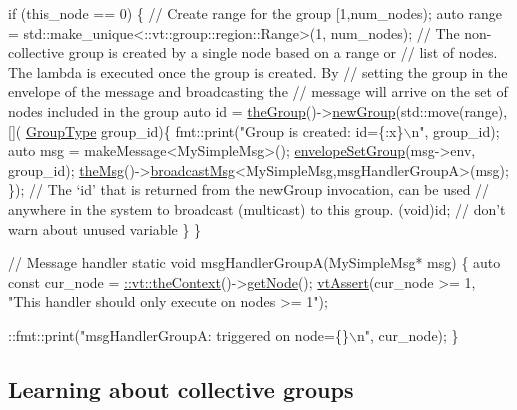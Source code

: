 \begin{DoxyCodeInclude}
  \textcolor{keywordflow}{if} (this\_node == 0) \{
    \textcolor{comment}{// Create range for the group [1,num\_nodes);}
    \textcolor{keyword}{auto} range = std::make\_unique<::vt::group::region::Range>(1, num\_nodes);
    \textcolor{comment}{// The non-collective group is created by a single node based on a range or}
    \textcolor{comment}{// list of nodes. The lambda is executed once the group is created. By}
    \textcolor{comment}{// setting the group in the envelope of the message and broadcasting the}
    \textcolor{comment}{// message will arrive on the set of nodes included in the group}
    \textcolor{keyword}{auto} \textcolor{keywordtype}{id} = \hyperlink{namespacevt_a4548473dce44fb654400009e2b2fe64e}{theGroup}()->\hyperlink{structvt_1_1group_1_1_group_manager_a076330445139abce77e1f6ab6e4358c5}{newGroup}(std::move(range), [](
      \hyperlink{namespacevt_a27b5e4411c9b6140c49100e050e2f743}{GroupType} group\_id)\{
      fmt::print(\textcolor{stringliteral}{"Group is created: id=\{:x\}\(\backslash\)n"}, group\_id);
      \textcolor{keyword}{auto} msg = makeMessage<MySimpleMsg>();
      \hyperlink{namespacevt_a9f9d4ce6034c0eaaf98bdffd33d0e1c7}{envelopeSetGroup}(msg->env, group\_id);
      \hyperlink{namespacevt_aeafd31f866aeb4dc6fc2f6ee97136350}{theMsg}()->\hyperlink{group__typesafehan_ga344802a09eb0e88006900976d1dfa204}{broadcastMsg}<MySimpleMsg,msgHandlerGroupA>(msg);
    \});
    \textcolor{comment}{// The `id' that is returned from the newGroup invocation, can be used}
    \textcolor{comment}{// anywhere in the system to broadcast (multicast) to this group.}
    (void)\textcolor{keywordtype}{id};  \textcolor{comment}{// don't warn about unused variable}
  \}
\}

\textcolor{comment}{// Message handler}
\textcolor{keyword}{static} \textcolor{keywordtype}{void} msgHandlerGroupA(MySimpleMsg* msg) \{
  \textcolor{keyword}{auto} \textcolor{keyword}{const} cur\_node = \hyperlink{namespacevt_a26551fe0e6e6a1371111df5b12c7e92c}{::vt::theContext}()->\hyperlink{structvt_1_1ctx_1_1_context_a0d52c263ce8516546a67443d9a86fa5f}{getNode}();
  \hyperlink{config__assert_8h_aeddd4990a496e91a0ca5d6c16437359b}{vtAssert}(cur\_node >= 1, \textcolor{stringliteral}{"This handler should only execute on nodes >= 1"});

  ::fmt::print(\textcolor{stringliteral}{"msgHandlerGroupA: triggered on node=\{\}\(\backslash\)n"}, cur\_node);
\}
\end{DoxyCodeInclude}
\hypertarget{tutorial-1f}{}\subsection{Learning about collective groups}\label{tutorial-1f}

